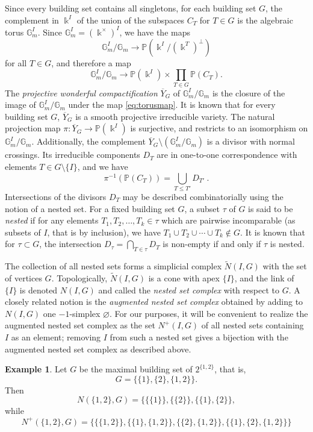 \documentclass[11pt]{article}
\theoremstyle{definition}
\newtheorem{exam}[theo]{Example}
\numberwithin{equation}{section}
\newcommand\kk{\Bbbk}
\begin{document}
Since every building set contains all singletons, for each building set $G$, the complement in $\kk^I$ of the union of the subspaces $C_T$ for $T\in G$ is the algebraic torus $\mathbb{G}_m^I$. Since $\mathbb{G}_m^I=(\kk^\times)^I$, we have the maps 
 \[
\mathbb{G}_m^I/\mathbb{G}_m\to\mathbb{P}(\kk^I/(\kk^T)^\bot)
 \]
for all $T\in G$, and therefore a map
\begin{equation}\label{eq:torusmap}
\mathbb{G}_m^I/\mathbb{G}_m\to\mathbb{P}(\kk^I)\times\prod_{T\in G} \mathbb{P}(C_T) .
\end{equation} 
The \emph{projective wonderful compactification} $\overline{Y}_G$ of $\mathbb{G}_m^I/\mathbb{G}_m$ is the closure of the image of $\mathbb{G}_m^I/\mathbb{G}_m$ under the map \eqref{eq:torusmap}. It is known that for every building set $G$, $\overline{Y}_G$ is a smooth projective irreducible variety. The natural projection map $\pi\colon \overline{Y}_G\to \mathbb{P}(\kk^I)$ is surjective, and restricts to an isomorphism on $\mathbb{G}_m^I/\mathbb{G}_m$. Additionally, the complement $\overline{Y}_G\setminus (\mathbb{G}_m^I/\mathbb{G}_m)$ is a divisor with normal crossings. Its irreducible components $D_T$ are in one-to-one correspondence with elements $T\in G\setminus\{I\}$, and we have 
    \[
\pi^{-1}(\mathbb{P}(C_T))=\bigcup_{T\leq T'} D_{T'} \ .  
    \]
Intersections of the divisors $D_T$ may be described combinatorially using the notion of a nested set. For a fixed building set $G$, a subset $\tau$ of $G$ is said to be \emph{nested} if for any elements $T_1,T_2,\ldots,T_k\in \tau$ which are pairwise incomparable (as subsets of $I$, that is by inclusion), we have $T_1\cup T_2\cup \cdots\cup T_k\notin G$. It is known that for $\tau\subset G$, the intersection $D_\tau=\bigcap_{T\in \tau} D_T$ is non-empty if and only if $\tau$ is nested. 

The collection of all nested sets forms a simplicial complex $\tilde{N}(I,G)$ with the set of vertices $G$. Topologically, $\tilde{N}(I,G)$ is a cone with apex $\{I\}$, and the link of $\{I\}$ is denoted $N(I,G)$ and called the \emph{nested set complex} with respect to $G$. 
A closely related notion is the \emph{augmented nested set complex} obtained by adding to $N(I,G)$ one $-1$-simplex $\varnothing$. For our purposes, it will be convenient to realize the augmented nested set complex as the set $N^+(I,G)$ of all nested sets containing~$I$ as an element; removing $I$ from such a nested set gives a bijection with the augmented nested set complex as described above. 

\begin{exam}
Let $G$ be the maximal building set of $2^{\{1,2\}}$, that is, \[G=\{\{1\},\{2\},\{1,2\}\}.\] Then 
 \[
N(\{1,2\},G)=\{
\{\{1\}\},
\{\{2\}\},
\{\{1\},\{2\}\},
 \]
while 
 \[ 
N^+(\{1,2\},G)=\{
\{\{1,2\}\},
\{\{1\},\{1,2\}\},
\{\{2\},\{1,2\}\},
\{\{1\},\{2\},\{1,2\}\}
\}
 \]
\end{exam}
\end{document}
